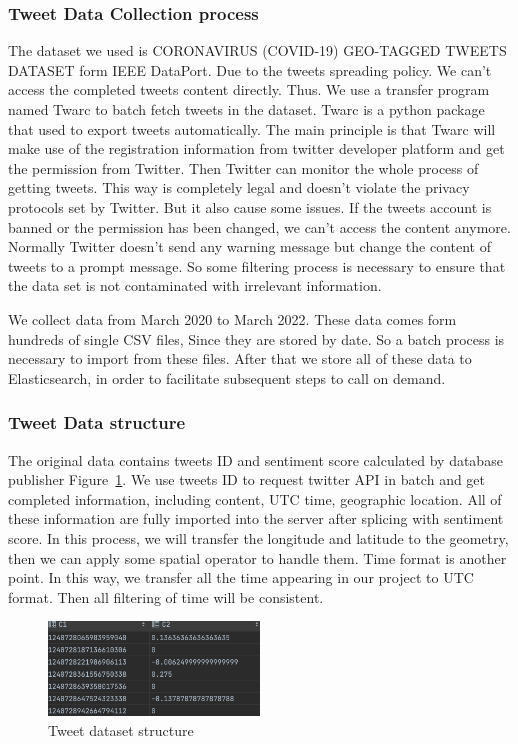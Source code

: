 \subsubsection{Tweet Data Collection process}
The dataset we used is CORONAVIRUS (COVID-19) GEO-TAGGED TWEETS DATASET form
IEEE DataPort. Due to the tweets spreading policy. We can't access the
completed tweets content directly.  Thus. We use a transfer program named
Twarc to batch fetch tweets in the dataset. Twarc is a python package
that used to export tweets automatically.  The main principle is that Twarc
will make use of the registration information from twitter developer platform
and get the permission from Twitter. Then Twitter can monitor the whole
process of getting tweets. This way is completely legal and doesn't violate
the privacy protocols set by Twitter. But it also cause some issues. If the
tweets account is banned or the permission has been changed, we can't access
the content anymore. Normally Twitter doesn't send any warning message but
change the content of tweets to a prompt message. So some filtering process
is necessary to ensure that the data set is not contaminated with irrelevant
information. 

We collect data from March 2020 to March 2022. These data comes form hundreds
of single CSV files, Since they are stored by date. So a batch process is
necessary to import from these files. After that we store all of these data
to Elasticsearch, in order to facilitate subsequent steps to call on demand. 

\subsubsection{Tweet Data structure}
The original data contains tweets ID and sentiment score calculated by
database publisher Figure~\ref{fig:Tweet dataset}. We use tweets ID to
request twitter API in batch and get completed information, including
content, UTC time, geographic location. All of these information are fully
imported into the server after splicing with sentiment score.  In this
process, we will transfer the longitude and latitude to the geometry, then we
can apply some spatial operator to handle them. Time format is another point.
In this way, we transfer all the time appearing in our project to UTC format.
Then all filtering of time will be consistent. 
\begin{figure}[h]
\centering
\includegraphics[width=0.5\textwidth]{imgs/row_tweets.png}
\caption{Tweet dataset structure}
\label{fig:Tweet dataset}
\end{figure}

